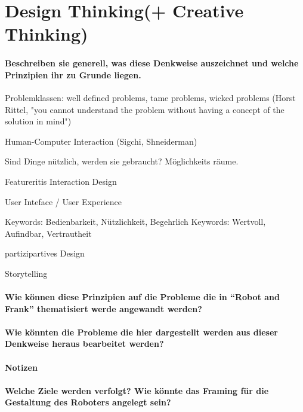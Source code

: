 \documentclass[sigchi-a, authorversion]{acmart}
\begin{document}
\section{Design Thinking(+ Creative Thinking)}

\paragraph{Beschreiben sie generell, was diese Denkweise auszeichnet und welche Prinzipien ihr zu Grunde liegen.}

Problemklassen:
	well defined problems,
	tame problems,
	wicked problems (Horst Rittel, "you cannot understand the problem without having a concept of the solution in mind")

Human-Computer Interaction (Sigchi, Shneiderman)

Sind Dinge nützlich, werden sie gebraucht? Möglichkeits räume.

Featureritis
Interaction Design

User Inteface / User Experience

Keywords: Bedienbarkeit, Nützlichkeit, Begehrlich
Keywords: Wertvoll, Aufindbar, Vertrautheit

partizipartives Design

Storytelling

\paragraph{Wie können diese Prinzipien auf die Probleme die in ``Robot and Frank'' thematisiert werde angewandt werden?}

\paragraph{Wie könnten die Probleme die hier dargestellt werden aus dieser Denkweise heraus bearbeitet werden?}

\paragraph{Notizen}

\paragraph{Welche Ziele werden verfolgt? Wie könnte das Framing für die Gestaltung des Roboters angelegt sein?}
\end{document}
